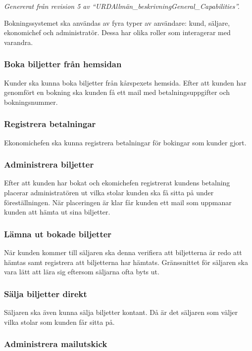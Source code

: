 \documentclass[a4paper, twoside, 11pt, titlepage]{article}
\begin{document}
	\emph{Genererat från revision 5 av ``URDAllmän\_beskrivningGeneral\_Capabilities''.}

	Bokningssystemet ska användas av fyra typer av användare: kund, säljare, ekonomichef och administratör. Dessa har olika roller som interagerar med varandra.

	\subsubsection{Boka biljetter från hemsidan}


		Kunder ska kunna boka biljetter från kårspexets hemsida. Efter att kunden har genomfört en bokning ska kunden få ett mail med betalningsuppgifter och bokningsnummer.

	\subsubsection{Registrera betalningar}


		Ekonomichefen ska kunna registrera betalningar för bokingar som kunder gjort.

	\subsubsection{Administrera biljetter}


		Efter att kunden har bokat och ekomichefen registrerat kundens betalning placerar administratören ut vilka stolar kunden ska få sitta på under föreställningen. När placeringen är klar får kunden ett mail som uppmanar kunden att hämta ut sina biljetter.

	\subsubsection{Lämna ut bokade biljetter}


		När kunden kommer till säljaren ska denna verifiera att biljetterna är redo att hämtas samt registrera att biljetterna har hämtats. Gränssnittet för säljaren ska vara lätt att lära sig eftersom säljarna ofta byts ut.

	\subsubsection{Sälja biljetter direkt}


		Säljaren ska även kunna sälja biljetter kontant. Då är det säljaren som väljer vilka stolar som kunden får sitta på.

	\subsubsection{Administrera mailutskick}
\end{document}
